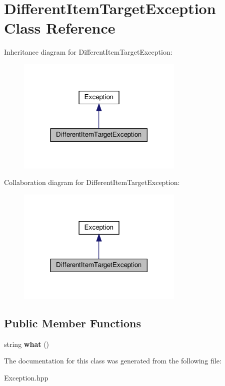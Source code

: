\hypertarget{classDifferentItemTargetException}{}\section{Different\+Item\+Target\+Exception Class Reference}
\label{classDifferentItemTargetException}


Inheritance diagram for Different\+Item\+Target\+Exception\+:
\nopagebreak
\begin{figure}[H]
\begin{center}
\leavevmode
\includegraphics[width=225pt]{classDifferentItemTargetException__inherit__graph}
\end{center}
\end{figure}


Collaboration diagram for Different\+Item\+Target\+Exception\+:
\nopagebreak
\begin{figure}[H]
\begin{center}
\leavevmode
\includegraphics[width=225pt]{classDifferentItemTargetException__coll__graph}
\end{center}
\end{figure}
\subsection*{Public Member Functions}
\begin{DoxyCompactItemize}
\item 
\mbox{\label{classDifferentItemTargetException_a3566195af75854aef6d1b7f56b9ba15d}} 
string {\bfseries what} ()
\end{DoxyCompactItemize}


The documentation for this class was generated from the following file\+:\begin{DoxyCompactItemize}
\item 
Exception.\+hpp\end{DoxyCompactItemize}
